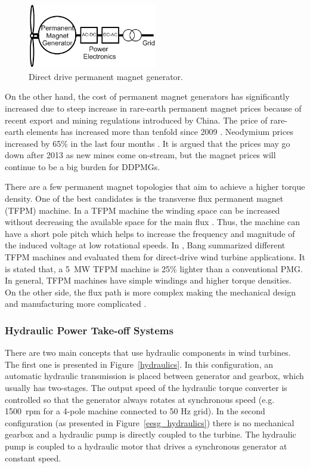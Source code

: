 \documentclass[a4paper, 11pt]{article} %
\begin{document}
  \begin{figure}
    \centering
    \includegraphics[width=0.5\textwidth]{DDPMG}
    \caption{Direct drive permanent magnet generator.} 
    \label{eesg}
  \end{figure}

On the other hand, the cost of permanent magnet generators has significantly increased due to steep increase in rare-earth permanent magnet prices because of recent export and mining regulations introduced by China. The price of rare-earth elements has increased more than tenfold since 2009 \cite{rareearthelements}. Neodymium prices increased by 65\% in the last four months \cite{japantimes}. It is argued that the prices may go down after 2013 as new mines come on-stream, but the magnet prices will continue to be a big burden for DDPMGs.

There are a few permanent magnet topologies that aim to achieve a higher torque density. One of the best candidates is the transverse flux permanent magnet (TFPM) machine. In a TFPM machine the winding space can be increased without decreasing the available space for the main flux \cite{Bang2010}. Thus, the machine can have a short pole pitch which helps to increase the frequency and magnitude of the induced voltage at low rotational speeds. In \cite{Bang2010}, Bang summarized different TFPM machines and evaluated them for direct-drive wind turbine applications. It is stated that, a 5~MW TFPM machine is  25\% lighter than a conventional PMG. In general, TFPM machines have simple windings and higher torque densities. On the other side, the flux path is more complex making the mechanical design and manufacturing more complicated \cite{Bang2009,Bang2008}.

\subsubsection{Hydraulic Power Take-off Systems}

There are two main concepts that use hydraulic components in wind turbines. The first one is presented in Figure~\ref{hydraulics}. In this configuration, an automatic hydraulic transmission is placed between generator and gearbox, which usually has two-stages. The output speed of the hydraulic torque converter is controlled so that the generator always rotates at synchronous speed (e.g. 1500~rpm for a 4-pole machine connected to 50 Hz grid). In the second configuration (as presented in Figure~\ref{eesg_hydraulics}) there is no mechanical gearbox and a hydraulic pump is directly coupled to the turbine. The hydraulic pump is coupled to a hydraulic motor that drives a synchronous generator at constant speed.
\end{document}
